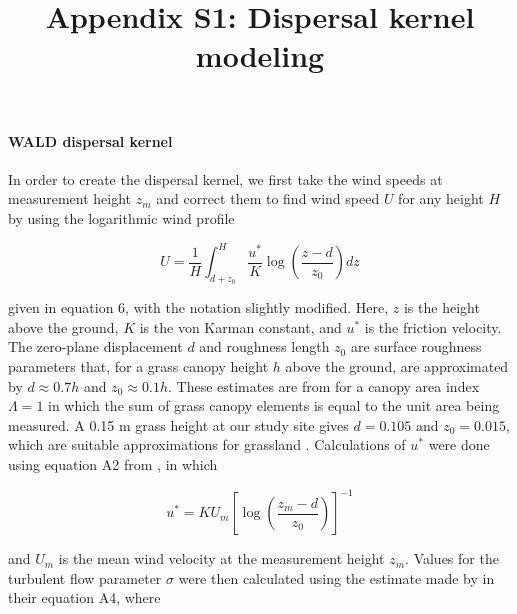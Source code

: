 \documentclass[11pt]{article}\usepackage[]{graphicx}\usepackage[usenames,dvipsnames]{xcolor}
\title{Appendix S1: Dispersal kernel modeling}
\author{ }
\date{\vspace{-5ex}}
\begin{document}
\maketitle
\renewcommand{\thefigure}{S\arabic{figure}}\setcounter{figure}{0}
\renewcommand{\thetable}{S\arabic{table}}\setcounter{table}{0}
\renewcommand{\theequation}{S\arabic{equation}}\setcounter{equation}{0}

\paragraph{WALD dispersal kernel}
In order to create the dispersal kernel, we first take the wind speeds at measurement height $z_{m}$ and correct them to find wind speed $U$ for any height $H$ by using the logarithmic wind profile

\begin{linenomath*} \begin{equation} U = \frac{1}{H} \int_{d+z_{0}}^{H} \frac{u^*}{K} \log \left(\frac{z-d}{z_{0}}\right) dz \end{equation} 
\end{linenomath*} 

given in \citet{bullock2012modelling} equation 6, with the notation slightly modified. 
Here, $z$ is the height above the ground, $K$ is the von Karman constant, and $u^*$ is the friction velocity.
The zero-plane displacement $d$ and roughness length $z_{0}$ are surface roughness parameters that, for a grass canopy height $h$ above the ground, are  approximated by $d \approx 0.7h$ and $z_{0} \approx 0.1h$.
These estimates are from \citet{raupach1994simplified} for a canopy area index $\Lambda = 1$ in which the sum of grass canopy elements is equal to the unit area being measured.
A 0.15 m grass height at our study site gives $d = 0.105$ and $z_{0} = 0.015$, which are suitable approximations for grassland \citep{wiernga1993representative}.
Calculations of $u^*$ were done using equation A2 from \citet{skarpaas2007dispersal}, in which 

\begin{linenomath*} \begin{equation} u^* = KU_{m} \left[\log\left(\frac{z_{m} - d}{z_{0}}\right)\right]^{-1} \end{equation} 
\end{linenomath*} 

and $U_{m}$ is the mean wind velocity at the measurement height $z_{m}$.
Values for the turbulent flow parameter $\sigma$ were then calculated using the estimate made by \citet{skarpaas2007dispersal} in their equation A4, where 
\end{document}
